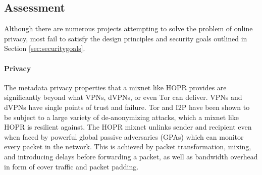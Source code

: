 \subsection{Assessment}

Although there are numerous projects attempting to solve the problem of online privacy, most fail to satisfy the design principles and security goals outlined in Section \ref{sec:securitygoals}.

\paragraph{Privacy} The metadata privacy properties that a mixnet like HOPR provides are significantly beyond what VPNs, dVPNs, or even Tor can deliver. VPNs and dVPNs have single points of trust and failure. Tor and I2P have been shown to be subject to a large variety of de-anonymizing attacks, which a mixnet like HOPR is resilient against. The HOPR mixnet unlinks sender and recipient even when faced by powerful global passive adversaries (GPAs) which can monitor every packet in the network. This is achieved by packet transformation, mixing, and introducing delays before forwarding a packet, as well as bandwidth overhead in form of cover traffic and packet padding.

